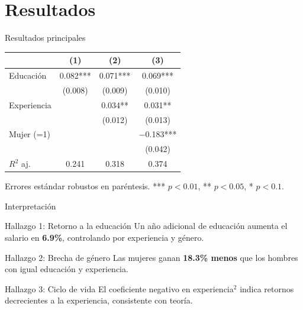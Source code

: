 \documentclass[aspectratio=169]{beamer}
\begin{document}
\section{Resultados}

\begin{frame}{Resultados principales}
  \begin{center}
  \begin{tabular}{lccc}
    \toprule
                  & (1)      & (2)      & (3)      \\
    \midrule
    Educación     & 0.082*** & 0.071*** & 0.069*** \\
                  & (0.008)  & (0.009)  & (0.010)  \\
    Experiencia   &          & 0.034**  & 0.031**  \\
                  &          & (0.012)  & (0.013)  \\
    Mujer (=1)    &          &          & $-$0.183*** \\
                  &          &          & (0.042)  \\
    \midrule
    $R^2$ aj.     & 0.241    & 0.318    & 0.374    \\
    \bottomrule
  \end{tabular}
  \end{center}
  \vspace{0.5em}
  \footnotesize Errores estándar robustos en paréntesis. 
  *** $p<0.01$, ** $p<0.05$, * $p<0.1$.
\end{frame}

\begin{frame}{Interpretación}
  \begin{block}{Hallazgo 1: Retorno a la educación}
    Un año adicional de educación aumenta el salario en \textbf{6.9\%},
    controlando por experiencia y género.
  \end{block}

  \begin{alertblock}{Hallazgo 2: Brecha de género}
    Las mujeres ganan \textbf{18.3\% menos} que los hombres con 
    igual educación y experiencia.
  \end{alertblock}

  \begin{block}{Hallazgo 3: Ciclo de vida}
    El coeficiente negativo en experiencia$^2$ indica retornos 
    decrecientes a la experiencia, consistente con teoría.
  \end{block}
\end{frame}
\end{document}
